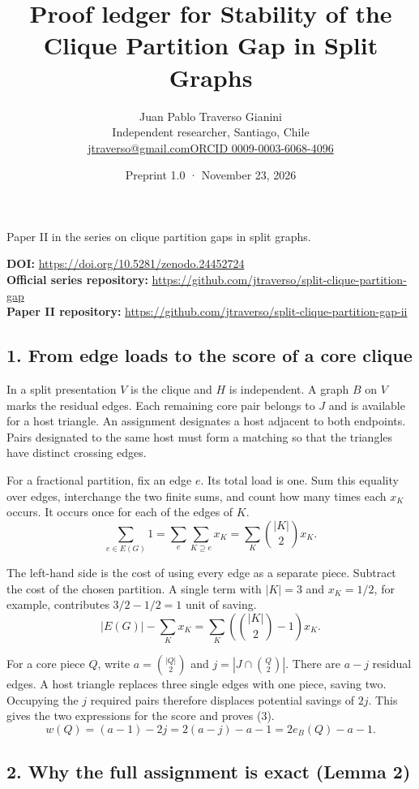 \documentclass[english,11pt,a4paper]{article}
\title{Proof ledger for Stability of the Clique Partition Gap in Split Graphs}
\author{Juan Pablo Traverso Gianini\\\small Independent researcher, Santiago, Chile\\\small\href{mailto:jtraverso@gmail.com}{jtraverso@gmail.com}\quad\href{https://orcid.org/0009-0003-6068-4096}{ORCID 0009-0003-6068-4096}}
\date{Preprint 1.0 \enspace · \enspace November 23, 2026}
\begin{document}
\raggedbottom\maketitle
\begin{center}\small Paper II in the series on clique partition gaps in split graphs.\end{center}
\noindent\textbf{DOI:} \url{https://doi.org/10.5281/zenodo.24452724}\\
\textbf{Official series repository:} \url{https://github.com/jtraverso/split-clique-partition-gap}\\
\textbf{Paper II repository:} \url{https://github.com/jtraverso/split-clique-partition-gap-ii}
\subsection{1. From edge loads to the score of a core clique}\label{from-edge-loads-to-the-score-of-a-core-clique}

In a split presentation \(V\) is the clique and \(H\) is independent. A graph \(B\) on \(V\) marks the residual edges. Each remaining core pair belongs to \(J\) and is available for a host triangle. An assignment designates a host adjacent to both endpoints. Pairs designated to the same host must form a matching so that the triangles have distinct crossing edges.

For a fractional partition, fix an edge \(e\). Its total load is one. Sum this equality over edges, interchange the two finite sums, and count how many times each \(x_K\) occurs. It occurs once for each of the edges of \(K\).
\[
\sum_{e\in E(G)}1=\sum_e\sum_{K\supseteq e}x_K=\sum_K\binom{|K|}{2}x_K.
\]

The left-hand side is the cost of using every edge as a separate piece. Subtract the cost of the chosen partition. A single term with \(|K|=3\) and \(x_K=1/2\), for example, contributes \(3/2-1/2=1\) unit of saving.
\[
|E(G)|-\sum_Kx_K=\sum_K\left(\binom{|K|}{2}-1\right)x_K.
\]

For a core piece \(Q\), write \(a=\binom{|Q|}{2}\) and \(j=|J\cap\binom Q2|\). There are \(a-j\) residual edges. A host triangle replaces three single edges with one piece, saving two. Occupying the \(j\) required pairs therefore displaces potential savings of \(2j\). This gives the two expressions for the score and proves (3).
\[
w(Q)=(a-1)-2j=2(a-j)-a-1=2e_B(Q)-a-1.
\]

\subsection{2. Why the full assignment is exact (Lemma 2)}\label{why-the-full-assignment-is-exact-lemma-2}
\end{document}
